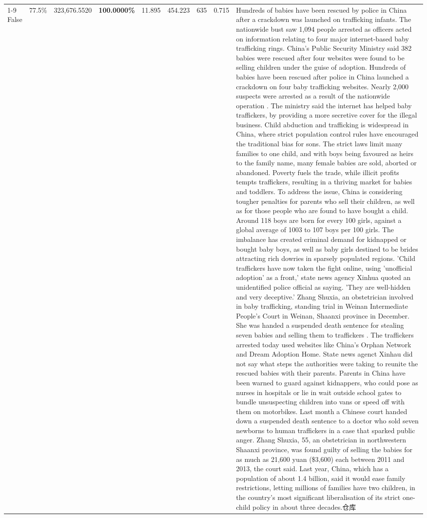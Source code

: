 \begin{table}[H]
\begin{tabular}{lllrlllll}
\cline{1-9}
False & 77.5\% & 323,676.5520 & \bfseries \color{red} 100.0000\% & 11.895 & 454.223 & 635 & 0.715 & Hundreds of babies have been rescued by police in China after a crackdown was launched on trafficking infants. The nationwide bust saw 1,094 people arrested as officers acted on information relating to four major internet-based baby trafficking rings. China's Public Security Ministry said 382 babies were rescued after four websites were found to be selling children under the guise of adoption. Hundreds of babies have been rescued after police in China launched a crackdown on four baby trafficking websites. Nearly 2,000 suspects were arrested as a result of the nationwide operation . The ministry said the internet has helped baby traffickers, by providing a more secretive cover for the illegal business. Child abduction and trafficking is widespread in China, where strict population control rules have encouraged the traditional bias for sons. The strict laws limit many families to one child, and with boys being favoured as heirs to the family name, many female babies are sold, aborted or abandoned. Poverty fuels the trade, while illicit profits tempts traffickers, resulting in a thriving market for babies and toddlers. To address the issue, China is considering tougher penalties for parents who sell their children, as well as for those people who are found to have bought a child. Around 118 boys are born for every 100 girls, against a global average of 1003 to 107 boys per 100 girls. The imbalance has created criminal demand for kidnapped or bought baby boys, as well as baby girls destined to be brides attracting rich dowries in sparsely populated regions. 'Child traffickers have now taken the fight online, using 'unofficial adoption' as a front,' state news agency Xinhua quoted an unidentified police official as saying. 'They are well-hidden and very deceptive.' Zhang Shuxia, an obstetrician involved in baby trafficking, standing trial in Weinan Intermediate People's Court in Weinan, Shaanxi province in December. She was handed a suspended death sentence for stealing seven babies and selling them to traffickers . The traffickers arrested today used websites like China's Orphan Network and Dream Adoption Home. State news agenct Xinhau did not say what steps the authorities were taking to reunite the rescued babies with their parents. Parents in China have been warned to guard against kidnappers, who could pose as nurses in hospitals or lie in wait outside school gates to bundle unsuspecting children into vans or speed off with them on motorbikes. Last month a Chinese court handed down a suspended death sentence to a doctor who sold seven newborns to human traffickers in a case that sparked public anger. Zhang Shuxia, 55, an obstetrician in northwestern Shaanxi province, was found guilty of selling the babies for as much as 21,600 yuan (\$3,600) each between 2011 and 2013, the court said. Last year, China, which has a population of about 1.4 billion, said it would ease family restrictions, letting millions of families have two children, in the country's most significant liberalisation of its strict one-child policy in about three decades.仓库 \\

\end{tabular}
\end{table}
